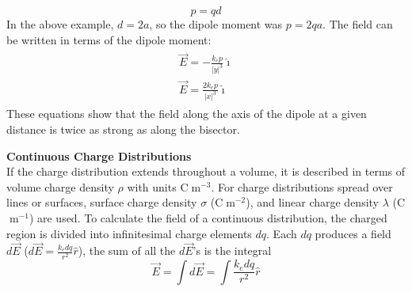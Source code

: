 \documentclass[a4paper]{article}
\let\bf\textbf
\newcommand{\ih}{\hat{\imath}}
\begin{document}
\begin{equation}
    p = qd
\end{equation}
In the above example, $d = 2a$, so the dipole moment was $p = 2qa$. The field can be written in terms of the dipole moment:
\begin{align}
    \begin{split}
        \vec{E} = -\frac{k_ep}{|y|^3}\ih \\
        \vec{E} = \frac{2k_ep}{|x|^3}\ih 
    \end{split}
\end{align}
These equations show that the field along the axis of the dipole at a given distance is twice as strong as along the bisector.

\newpage
\noindent\bf{Continuous Charge Distributions}
\vspace{1mm}\\
If the charge distribution extends throughout a volume, it is described in terms of volume charge density $\rho$ with units C$\;$m$^{-3}$. For charge distributions spread over lines or surfaces, surface charge density $\sigma$ (C$\;$m$^{-2}$), and linear charge density $\lambda$ (C$\;$m$^{-1}$) are used. To calculate the field of a continuous distribution, the charged region is divided into infinitesimal charge elements $dq$. Each $dq$ produces a field $d\vec{E}$ ($d\vec{E} = \frac{k_edq}{r^2}\hat{r}$), the sum of all the $d\vec{E}$'s is the integral
\begin{equation}
    \vec{E} = \int d\vec{E} = \int \frac{k_edq}{r^2}\hat{r}
\end{equation}
\end{document}
